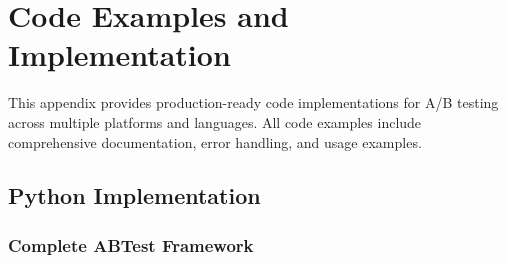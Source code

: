 \appendix
\chapter{Code Examples and Implementation}

This appendix provides production-ready code implementations for A/B testing across multiple platforms and languages. All code examples include comprehensive documentation, error handling, and usage examples.

\section{Python Implementation}

\subsection{Complete ABTest Framework}

